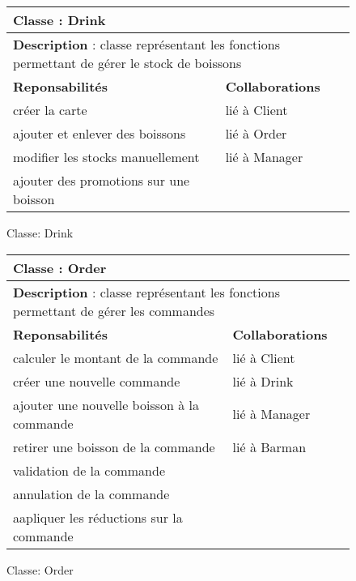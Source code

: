 \documentclass{article}
\begin{document}
\begin{figure}

\begin{tabular}{|p{7cm}|p{7cm}|}
\hline
 \multicolumn{2}{|p{12cm}|}{\textbf{Classe} : Drink }
   \\
 \hline
  \multicolumn{2}{|p{12cm}|}{ \textbf{Description} : classe représentant les fonctions permettant de gérer le stock de boissons }
\\
 \hline
 \textbf{Reponsabilités} & \textbf{Collaborations} \\
 \hline
 créer la carte & lié à Client \\
 ajouter et enlever des boissons & lié à Order \\
 modifier les stocks manuellement & lié à Manager\\
 ajouter des promotions sur une boisson & \\
  \hline
\end{tabular}
\caption{Classe: Drink}
\label{tab:drink}
\end{figure}


\begin{figure}
\begin{tabular}{|p{7cm}|p{7cm}|}
\hline
 \multicolumn{2}{|p{12cm}|}{\textbf{Classe} : Order }
   \\
 \hline
  \multicolumn{2}{|p{12cm}|}{ \textbf{Description} : classe représentant les fonctions permettant de gérer les commandes }
\\
 \hline
 \textbf{Reponsabilités} & \textbf{Collaborations} \\
 \hline
 calculer le montant de la commande & lié à Client \\
 créer une nouvelle commande & lié à Drink \\
ajouter une nouvelle boisson à la commande & lié à Manager\\
retirer une boisson de la commande & lié à Barman \\
validation de la commande &\\
annulation de la commande &\\
aapliquer les réductions sur la commande & \\
  \hline
\end{tabular}
\caption{Classe: Order}
\label{tab:order}
\end{figure}
\end{document}
